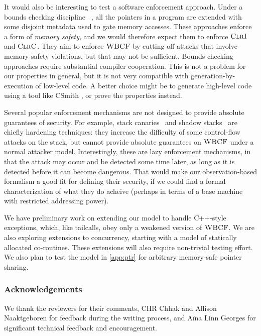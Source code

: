 \documentclass[10pt,conference]{ieeetran}%
\theoremstyle{definition}
\begin{document}
It would also be interesting to test a software enforcement approach.
Under a bounds checking discipline~%
\cite{NagarakatteZMZ09}, all the pointers
in a program are extended with some disjoint metadata %
used
to gate memory accesses. These approaches enforce a form of \emph{memory safety},
and we would therefore expect them to enforce \(\textnormal{\sc ClrI}\) and \(\textnormal{\sc ClrC}\). They aim
to enforce \(\textnormal{\sc WBCF}\) by cutting off attacks that involve memory-safety violations,
but that may not be sufficient.
Bounds checking approaches require substantial compiler cooperation. This is not a
problem for our properties in general, but it is not very compatible with
generation-by-execution of low-level code. A better choice might be to generate
high-level code using a tool like CSmith \cite{DBLP:conf/pldi/YangCER11}, or prove the properties instead.

Several popular enforcement mechanisms are not designed to provide
absolute guarantees of security. For example, stack canaries~\cite{Cowan+98}
and shadow stacks~\cite{Dang+15,Shanbhogue+19}
are chiefly hardening techniques: they increase the difficulty
of some control-flow attacks on the stack, but cannot provide absolute
guarantees on \(\textnormal{\sc WBCF}\) under a normal attacker model.
%
Interestingly, these are lazy enforcement mechanisms, in that
the attack may occur and be detected some time later, as long as
it is detected before it can become dangerous. That would make our
observation-based formalism a good fit for defining their security,
if we could find a formal characterization of what they do acheive
(perhaps in terms of a base machine with restricted addressing power).

We have preliminary work on extending our model to handle C++-style
exceptions, which, like tailcalls, obey only a weakened version of \(\textnormal{\sc WBCF}\).
We are also exploring extensions to concurrency, starting with a model of
statically allocated co-routines.  These extensions will also require non-trivial
testing effort.  We also plan to test
the model in \cref{app:ptr} for arbitrary memory-safe pointer sharing.

\subsubsection*{Acknowledgements}

We thank the reviewers for their comments, CHR Chhak and Allison Naaktgeboren for
feedback during the writing process, and A\"ina Linn Georges for significant technical
feedback and encouragement.
\end{document}
